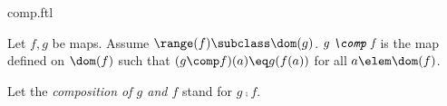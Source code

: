 \documentclass{naproche-library}
\begin{document}
\begin{smodule}[title=Composition]{comp.ftl}



\begin{definition}[forthel,id=CompDef]
  Let $f, g$ be maps.
  Assume $\range(f) \subclass \dom(g)$.
  $\emph{g \comp f}$ is the map defined on $\dom(f)$ such that $(g \comp f)(a) \eq g(f(a))$ for all $a \elem \dom(f)$.

  Let the \emph{composition of $g$ and $f$} stand for $g \comp f$.
\end{definition}

\end{smodule}
\end{document}
